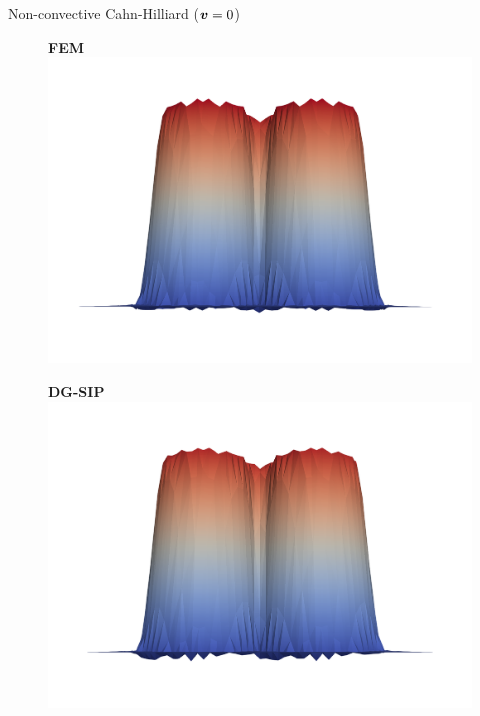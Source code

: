 \begin{frame}{Non-convective Cahn-Hilliard {\small($\boldsymbol{v}=0$)}}
	\vspace{-0.3cm}
	\begin{figure}[t]
		\begin{minipage}{0.32\textwidth}
			\centering
			\textbf{FEM}
			\includegraphics[scale=0.07]{img/non-convective-cahn-hilliard/u_sol_FE_nt-1000_nx-50_T-0.001_P0_adv-0.0_nx-50.png}
		\end{minipage}
		\begin{minipage}{0.32\textwidth}
			\centering
			\textbf{DG-SIP}
			\includegraphics[scale=0.07]{img/non-convective-cahn-hilliard/u_sol_DG-SIP-Sig_nt-1000_nx-50_T-0.001_P0_adv-0.0_nx-50.png}
		\end{minipage}
		\begin{minipage}{0.32\textwidth}

\end{minipage}
\end{figure}
\end{frame}
